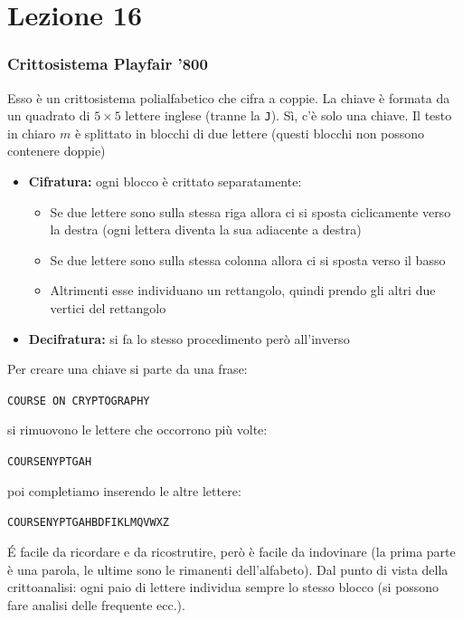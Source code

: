 \section*{Lezione 16}

\subsubsection*{Crittosistema Playfair '800}

Esso è un crittosistema polialfabetico che cifra a coppie. La chiave è formata da un quadrato di $5 \times 5$ lettere inglese (tranne la \texttt{J}). Sì, c'è solo una chiave.
Il testo in chiaro $m$ è splittato in blocchi di due lettere (questi blocchi non possono contenere doppie)
\begin{itemize}
	\item \textbf{Cifratura:} ogni blocco è crittato separatamente:
	\begin{itemize}
		\item Se due lettere sono sulla stessa riga allora ci si sposta ciclicamente verso la destra (ogni lettera diventa la sua adiacente a destra)
		\item Se due lettere sono sulla stessa colonna allora ci si sposta verso il basso
		\item Altrimenti esse individuano un rettangolo, quindi prendo gli altri due vertici del rettangolo
	\end{itemize}
\item \textbf{Decifratura:} si fa lo stesso procedimento però all'inverso
\end{itemize}
Per creare una chiave si parte da una frase:
\begin{center}
	\texttt{COURSE ON CRYPTOGRAPHY}
\end{center}
si rimuovono le lettere che occorrono più volte:
\begin{center}
	\texttt{COURSENYPTGAH}
\end{center}
poi completiamo inserendo le altre lettere:
\begin{center}
	\texttt{COURSENYPTGAHBDFIKLMQVWXZ}
\end{center}

\'E facile da ricordare e da ricostrutire, però è facile da indovinare (la prima parte è una parola, le ultime sono le rimanenti dell'alfabeto).
Dal punto di vista della crittoanalisi: ogni paio di lettere individua sempre lo stesso blocco (si possono fare analisi delle frequente ecc.).

